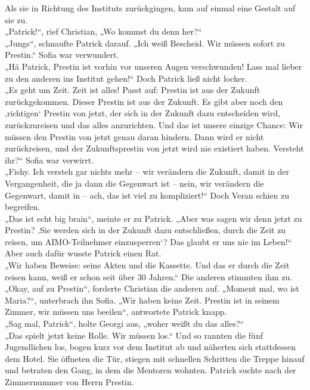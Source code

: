 \documentclass[oneside]{memoir}
\begin{document}
Als sie in Richtung des Instituts zurückgingen, kam auf einmal eine Gestalt auf sie zu. \\
„Patrick!“, rief Christian, „Wo kommst du denn her?“ \\
„Jungs“, schnaufte Patrick darauf. „Ich weiß Bescheid. Wir müssen sofort zu Prestin.“
Sofia war verwundert. \\ „Hä Patrick, Prestin ist vorhin vor unseren Augen verschwunden! Lass mal lieber zu den anderen ins Institut gehen!“
Doch Patrick ließ nicht locker.  \\
„Es geht um Zeit. Zeit ist alles! Passt auf: Prestin ist aus der Zukunft zurückgekommen. Dieser Prestin ist aus der Zukunft. Es gibt aber noch den ‚richtigen‘ Prestin von jetzt, der sich in der Zukunft dazu entscheiden wird, zurückzureisen und das alles anzurichten. Und das ist unsere einzige Chance: Wir müssen den Prestin von jetzt genau daran hindern. Dann wird er nicht zurückreisen, und der Zukunftsprestin von jetzt wird nie existiert haben. Versteht ihr?“
Sofia war verwirrt. \\
„Fishy. Ich versteh gar nichts mehr – wir verändern die Zukunft, damit in der Vergangenheit, die ja dann die Gegenwart ist – nein, wir verändern die Gegenwart, damit in – ach, das ist viel zu kompliziert!“
Doch Veran schien zu begreifen. \\
„Das ist echt big brain“, meinte er zu Patrick. „Aber was sagen wir denn jetzt zu Prestin? ‚Sie werden sich in der Zukunft dazu entschließen, durch die Zeit zu reisen, um AIMO-Teilnehmer einzusperren‘? Das glaubt er uns nie im Leben!“
Aber auch dafür wusste Patrick einen Rat. \\
„Wir haben Beweise: seine Akten und die Kassette. Und das er durch die Zeit reisen kann, weiß er schon seit über 30 Jahren.“
Die anderen stimmten ihm zu. \\
„Okay, auf zu Prestin“, forderte Christian die anderen auf.
„Moment mal, wo ist Maria?“, unterbrach ihn Sofia.
„Wir haben keine Zeit. Prestin ist in seinem Zimmer, wir müssen uns beeilen“, antwortete Patrick knapp. \\
„Sag mal, Patrick“, holte Georgi aus, „woher weißt du das alles?“ \\
„Das spielt jetzt keine Rolle. Wir müssen los.“
Und so rannten die fünf Jugendlichen los, bogen kurz vor dem Institut ab und näherten sich stattdessen dem Hotel. Sie öffneten die Tür, stiegen mit schnellen Schritten die Treppe hinauf und betraten den Gang, in dem die Mentoren wohnten. Patrick suchte nach der Zimmernummer von Herrn Prestin. \\
\end{document}
